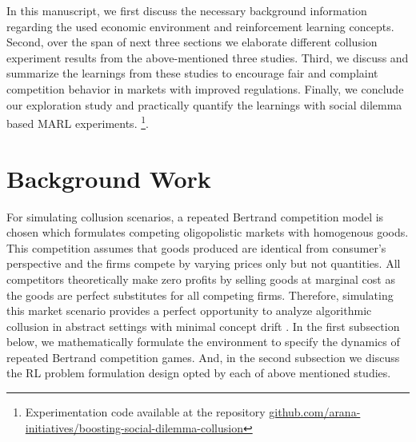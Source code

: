 \documentclass{article}
\begin{document}
In this manuscript, we first discuss the necessary background information regarding the used economic environment and reinforcement learning concepts.
Second, over the span of next three sections we elaborate different collusion experiment results from the above-mentioned three studies.
Third, we discuss and summarize the learnings from these studies to encourage fair and complaint competition behavior in markets with improved regulations.
Finally, we conclude our exploration study and practically quantify the learnings with social dilemma based MARL experiments. \footnote{Experimentation code available at the repository \href{https://github.com/arana-initiatives/boosting-social-dilemma-collusion}{github.com/arana-initiatives/boosting-social-dilemma-collusion}}.


\section{Background Work}


For simulating collusion scenarios, a repeated Bertrand competition model is chosen which formulates competing oligopolistic markets with homogenous goods.
This competition assumes that goods produced are identical from consumer’s perspective and the firms compete by varying prices only but not quantities.
All competitors theoretically make zero profits by selling goods at marginal cost as the goods are perfect substitutes for all competing firms.
Therefore, simulating this market scenario provides a perfect opportunity to analyze algorithmic collusion in abstract settings with minimal concept drift \cite{lu2018learning}.
In the first subsection below, we mathematically formulate the environment to specify the dynamics of repeated Bertrand competition games.
And, in the second subsection we discuss the RL problem formulation design opted by each of above mentioned studies.



\end{document}
